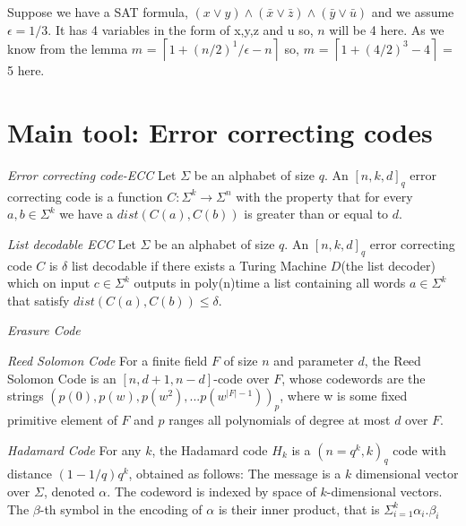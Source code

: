 Suppose we have a SAT formula, $(x\vee y) \wedge (\bar{x}\vee \bar{z}) \wedge (\bar{y}\vee \bar{u})$ and we assume $\epsilon=1/3$.
It has 4 variables in the form of x,y,z and u so, $n$ will be 4 here. 
As we know from the lemma $m$ = $\left\lceil 1+ (n/2)^1/\epsilon - n\right\rceil$
so, $m$ = $\left\lceil 1+ (4/2)^3 - 4\right\rceil$ = 5 here. 





\section{Main tool: Error correcting codes}


\begin{definition}\cite{FLN00}
\emph{Error correcting code-ECC}
Let $\Sigma$ be an alphabet of size $q$. An $[n,k,d]_q$ error correcting code is a function $C:\Sigma^k \rightarrow \Sigma^n$ with the property that for every $a,b \in \Sigma^k$ we have a $dist(C(a),C(b))$ is greater than or equal to $d$.
\end{definition}


\begin{definition}\cite{FLN00}
\emph{List decodable ECC}
Let $\Sigma$ be an alphabet of size $q$. An $[n,k,d]_q$ error correcting code $C$ is $\delta$ list decodable if there exists a Turing Machine $D$(the list decoder) which on input $c\in\Sigma^k$ outputs in poly(n)time a list containing all words $a\in \Sigma^k$ that satisfy $dist(C(a),C(b)) \leq \delta$. 
\end{definition}



\begin{definition}
\emph{Erasure Code}
\
\end{definition}



\begin{definition}\cite{Sud96}
\emph{Reed Solomon Code}
For a finite field $F$ of size $n$ and parameter $d$, the Reed Solomon Code is an $\left[n,d+1,n-d\right]$-code over $F$, whose codewords are the strings ${(p(0),p(w),p(w^2),...p(w^{|F|-1}))_p}$, where w is some fixed primitive element of $F$ and $p$ ranges all polynomials of degree at most $d$ over $F$.
\end{definition}

\begin{definition}\cite{Sud00}
\emph{Hadamard Code}
For any $k$, the Hadamard code $H_k$ is a $(n=q^k,k)_q$ code with distance $(1-1/q)q^k$, obtained as follows: The message is a $k$ dimensional vector over $\Sigma$, denoted $\alpha$. The codeword is indexed by space of $k$-dimensional vectors. The $\beta$-th symbol in the encoding of $\alpha$ is their inner product, that is $\Sigma^{k}_{i=1} \alpha_i . \beta_i$
\end{definition}




